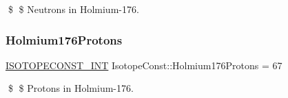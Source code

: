 \$ \$ Neutrons in Holmium-\/176. \mbox{\label{group___isotope_const-_holmium-_ho176_gaebbb5aeb6eb7fdd4f5a4d672aee67f3a}} 
\subsubsection{\texorpdfstring{Holmium176\+Protons}{Holmium176Protons}}
{\footnotesize\ttfamily \mbox{\hyperlink{group___isotope_const-_macros_ga5f18360b3e99483a35c32d789e62621c}{I\+S\+O\+T\+O\+P\+E\+C\+O\+N\+S\+T\+\_\+\+I\+NT}} Isotope\+Const\+::\+Holmium176\+Protons = 67}

\$ \$ Protons in Holmium-\/176. 